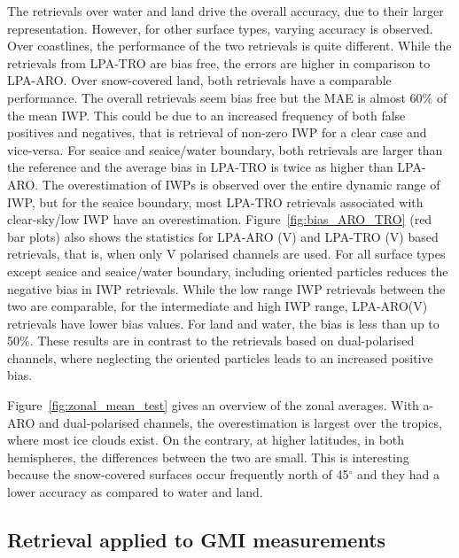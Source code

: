 \documentclass[amt, manuscript]{copernicus}
\begin{document}
The retrievals over water and land drive the overall accuracy, due to their larger representation. However, for other surface types, varying accuracy is observed. Over coastlines, the performance of the two retrievals is quite different. While the retrievals from LPA-TRO are bias free, the errors are higher in comparison to LPA-ARO. Over snow-covered land, both retrievals have a comparable performance. The overall retrievals seem bias free but the MAE is almost 60\% of the mean IWP. This could be due to an increased frequency of both false positives and negatives, that is retrieval of non-zero IWP for a clear case and vice-versa. For seaice and seaice/water boundary, both retrievals are larger than the reference and the average bias in LPA-TRO is twice as higher than LPA-ARO. The overestimation of IWPs is observed over the entire dynamic range of IWP, but for the seaice boundary, most LPA-TRO retrievals associated with clear-sky/low IWP have an overestimation. Figure~\ref{fig:bias_ARO_TRO} (red bar plots) also shows the statistics for LPA-ARO (V) and LPA-TRO (V) based retrievals, that is, when only V polarised channels are used. For all surface types except seaice and seaice/water boundary, including oriented particles reduces the negative bias in IWP retrievals. While the low range IWP retrievals between the two are comparable, for the intermediate and high IWP range, LPA-ARO(V) retrievals have lower bias values. For land and water, the bias is less than up to 50\%. These results are in contrast to the retrievals based on dual-polarised channels, where neglecting the oriented particles leads to an increased positive bias.


Figure~\ref{fig:zonal_mean_test} gives an overview of the zonal averages. With a-ARO and dual-polarised channels, the overestimation is largest over the tropics, where most ice clouds exist. On the contrary, at higher latitudes, in both hemispheres, the differences between the two are small. This is interesting because the snow-covered surfaces occur frequently north of 45$^{\circ}$ and they had a lower accuracy as compared to water and land. 




\subsection{Retrieval applied to GMI measurements}
\label{sec:IWP_GMI}
\end{document}
